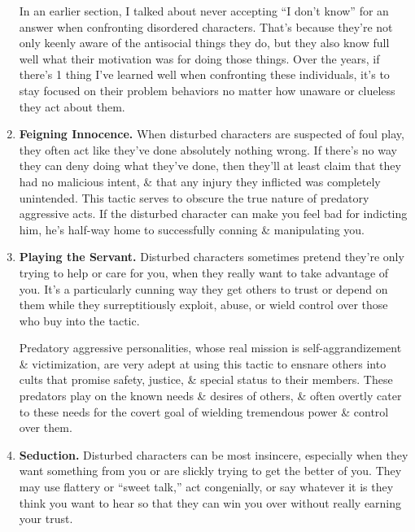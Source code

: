 \documentclass{article}
\numberwithin{equation}{section}
\begin{document}
\begin{enumerate}
	In an earlier section, I talked about never accepting ``I don't know'' for an answer when confronting disordered characters. That's because they're not only keenly aware of the antisocial things they do, but they also know full well what their motivation was for doing those things. Over the years, if there's 1 thing I've learned well when confronting these individuals, it's to stay focused on their problem behaviors no matter how unaware or clueless they act about them.
	\item \textbf{Feigning Innocence.} When disturbed characters are suspected of foul play, they often act like they've done absolutely nothing wrong. If there's no way they can deny doing what they've done, then they'll at least claim that they had no malicious intent, \& that any injury they inflicted was completely unintended. This tactic serves to obscure the true nature of predatory aggressive acts. If the disturbed character can make you feel bad for indicting him, he's half-way home to successfully conning \& manipulating you.
	\item \textbf{Playing the Servant.} Disturbed characters sometimes pretend they're only trying to help or care for you, when they really want to take advantage of you. It's a particularly cunning way they get others to trust or depend on them while they surreptitiously exploit, abuse, or wield control over those who buy into the tactic.
	
	Predatory aggressive personalities, whose real mission is self-aggrandizement \& victimization, are very adept at using this tactic to ensnare others into cults that promise safety, justice, \& special status to their members. These predators play on the known needs \& desires of others, \& often overtly cater to these needs for the covert goal of wielding tremendous power \& control over them.
	\item \textbf{Seduction.} Disturbed characters can be most insincere, especially when they want something from you or are slickly trying to get the better of you. They may use flattery or ``sweet talk,'' act congenially, or say whatever it is they think you want to hear so that they can win you over without really earning your trust.
	

\end{enumerate}
\end{document}
